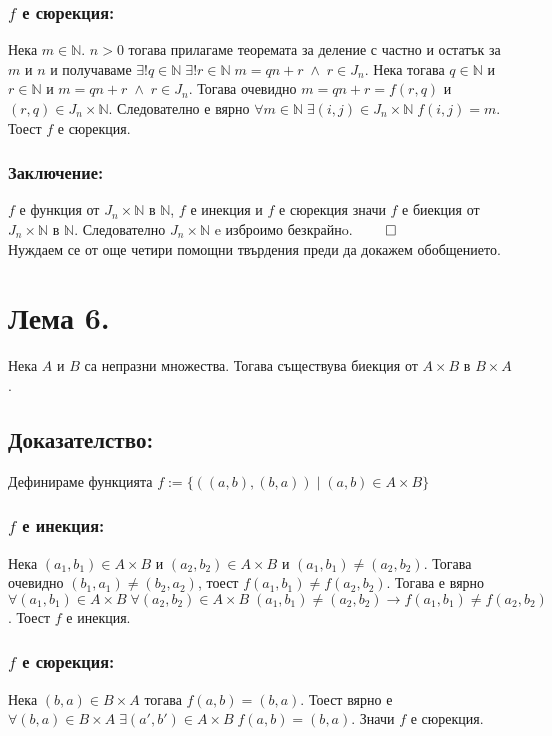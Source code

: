 \documentclass[a4paper, 12pt, oneside]{article}
\newcommand{\N}{\mathbb{N}}
\begin{document}
\subsubsection*{\(f\) е сюрекция:}
Нека \(m \in \N\). \(n > 0\) тогава прилагаме теоремата за деление с частно и остатък за \(m\) и \(n\)
и получаваме \(\exists! q \in \N \; \exists! r \in \N \; m = qn + r \; \land \; r \in J_n\).
Нека тогава \(q \in \N\) и \(r \in \N\) и \(m = qn + r \; \land \; r \in J_n\).
Тогава очевидно \(m = qn + r = f(r, q)\) и \((r, q) \in J_n \times \N\).
Следователно е вярно \(\forall m \in \N \; \exists (i, j) \in J_n \times \N \; f(i, j) = m\).
Тоест \(f\) е сюрекция.
\subsubsection*{Заключение:}
\(f\) е функция от \(J_n \times \N\)  в \(\N\),  \(f\) е инекция и \(f\) е сюрекция
значи \(f\) е биекция от \(J_n \times \N\)  в \(\N\). Следователно \(J_n \times \N\) e изброимо безкрайнo. \(\qed\) \\
Нуждаем се от още четири помощни твърдения преди да докажем обобщението.
\section*{Лема 6.}
Нека \(A\) и \(B\) са непразни множества.
Тогава съществува биекция от \(A \times B\) в \(B \times A\).
\subsection*{Доказателство:}
Дефинираме функцията \(f := \{((a, b), (b, a)) \; | \; (a, b) \in A \times B\}\)
\subsubsection*{\(f\) е инекция:}
Нека \((a_1, b_1) \in A \times B\) и \((a_2, b_2) \in A \times B\) и \((a_1, b_1) \neq (a_2, b_2)\).
Тогава очевидно \((b_1, a_1) \neq (b_2, a_2)\), тоест \(f(a_1, b_1) \neq f(a_2, b_2)\).
Тогава е вярно \(\forall (a_1, b_1) \in A \times B \; \forall (a_2, b_2) \in A \times B \; (a_1, b_1) \neq (a_2, b_2) \longrightarrow f(a_1, b_1) \neq f(a_2, b_2)\).
Тоест \(f\) е инекция.
\subsubsection*{\(f\) е сюрекция:}
Нека \((b, a) \in B \times A\) тогава \(f(a, b) = (b, a)\).
Тоест вярно е \(\forall (b, a) \in B \times A \; \exists (a', b') \in A \times B \; f(a, b) = (b, a)\).
Значи \(f\) е сюрекция.
\end{document}
